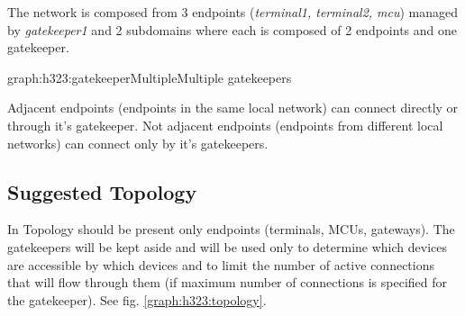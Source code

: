 The network is composed from 3 endpoints (\emph{terminal1, terminal2, mcu}) 
managed by \emph{gatekeeper1} and 2 subdomains where each is composed of 2 
endpoints and one gatekeeper.%
\begin{Graph}{graph:h323:gatekeeperMultiple}{Multiple gatekeepers}
  

     
  

\end{Graph}%
Adjacent endpoints (endpoints in the same local network) can connect directly 
or through it's gatekeeper. Not adjacent endpoints (endpoints from different 
local networks) can connect only by it's gatekeepers.

\subsection{Suggested Topology}
In Topology should be present only endpoints (terminals, MCUs, gateways). The 
gatekeepers will be kept aside and will be used only to determine which 
devices are accessible by which devices and to limit the number of active 
connections that will flow through them (if maximum number of connections is 
specified for the gatekeeper). See fig. \ref{graph:h323:topology}.

